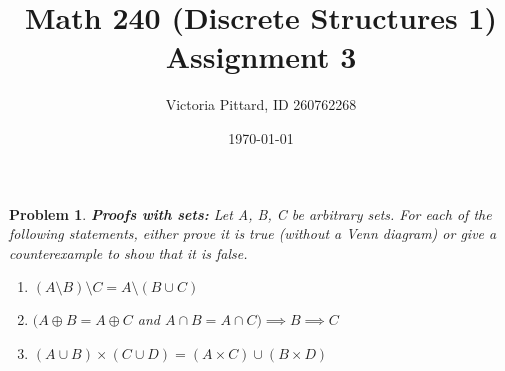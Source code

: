 \documentclass{article}
\newtheorem{problem}{Problem}
\theoremstyle{definition}
\begin{document}
\title{Math 240 (Discrete Structures 1) Assignment 3}
\author{Victoria Pittard, ID 260762268}
\date{\today}

\maketitle

\begin{problem}
\textbf{Proofs with sets:} Let A, B, C be arbitrary sets. For each of the following statements, either prove it is true (without a Venn diagram) or give a counterexample to show that it is false.
\begin{enumerate}[label = \alph*)]
    \item $(A \setminus B)\setminus C = A\setminus (B \cup C)$
    
    \item $(A\oplus B = A \oplus C$ and $A \cap B = A \cap C) \implies B \implies C$
    
    \item $(A \cup B) \times (C \cup D) = (A \times C) \cup (B \times D)$
\end{enumerate}
\end{problem}
\end{document}
